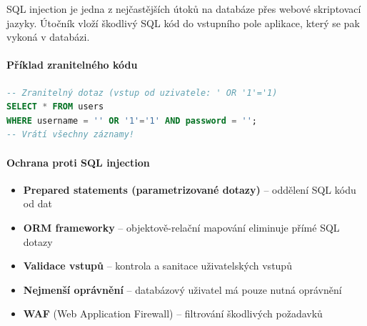 \documentclass[12pt,a4paper]{article}
\begin{document}
SQL injection je jedna z nejčastějších útoků na databáze přes webové skriptovací jazyky.
Útočník vloží škodlivý SQL kód do vstupního pole aplikace, který se pak vykoná v databázi.

\paragraph{Příklad zranitelného kódu}
\begin{lstlisting}[language=SQL]
-- Zranitelný dotaz (vstup od uzivatele: ' OR '1'='1)
SELECT * FROM users
WHERE username = '' OR '1'='1' AND password = '';
-- Vrátí všechny záznamy!
\end{lstlisting}

\paragraph{Ochrana proti SQL injection}
\begin{itemize}
  \item \textbf{Prepared statements (parametrizované dotazy)} -- oddělení SQL kódu od dat
  \item \textbf{ORM frameworky} -- objektově-relační mapování eliminuje přímé SQL dotazy
  \item \textbf{Validace vstupů} -- kontrola a sanitace uživatelských vstupů
  \item \textbf{Nejmenší oprávnění} -- databázový uživatel má pouze nutná oprávnění
  \item \textbf{WAF} (Web Application Firewall) -- filtrování škodlivých požadavků
\end{itemize}
\end{document}
